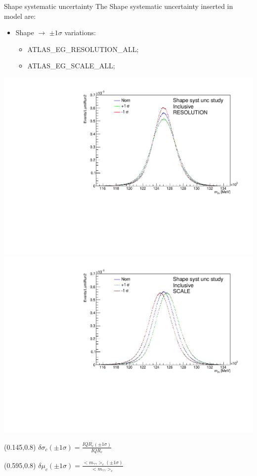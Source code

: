 \documentclass[10pt,UKenglish, leqno, xcolor = dvipsnames]{beamer}
\begin{document}
	\begin{frame}{Shape systematic uncertainty}
		\vfill
		The Shape systematic uncertainty inserted in model are:
		\begin{itemize}
			\item Shape $\rightarrow$ $\pm1\sigma$ variations:
			\begin{itemize}
				\item ATLAS\_EG\_RESOLUTION\_ALL;
				\item ATLAS\_EG\_SCALE\_ALL;
			\end{itemize}
		\end{itemize}
		\begin{center}
			\includegraphics[width=.475\textwidth]{Pres_Images/Syst/var_shape_scale_no.pdf}
			\includegraphics[width=.475\textwidth]{Pres_Images/Syst/var_shape_res_no.pdf}
		\end{center}
		\vfill
		
		\begin{textblock}{}(0.145,0.8)
			\small
			$\delta\sigma_c(\pm1\sigma)=\frac{IQR_c(\pm1\sigma)}{IQR_c}$
		\end{textblock}
	
		\begin{textblock}{}(0.595,0.8)
			\small
			$\delta\mu_c(\pm1\sigma)=\frac{<m_{\gamma\gamma}>_c(\pm1\sigma)}{<m_{\gamma\gamma}>_c}$
		\end{textblock}
	\end{frame}
\end{document}
